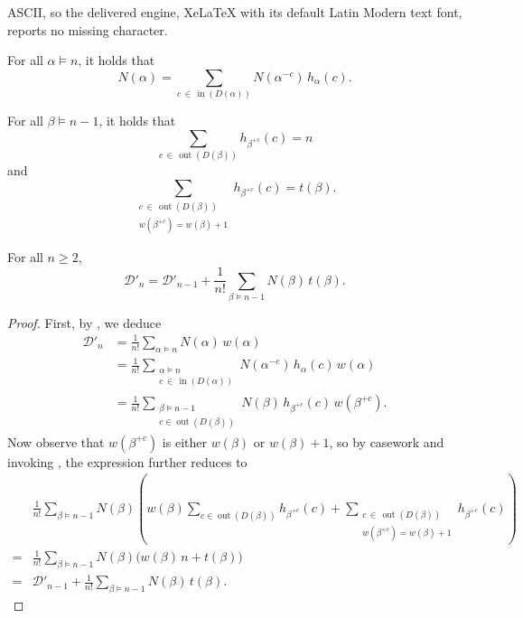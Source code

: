 \documentclass[10pt,a4paper]{amsart}
\DeclareMathOperator{\inn}{in}
\DeclareMathOperator{\out}{out}
\begin{document}
ASCII, so the delivered engine, XeLaTeX with its default Latin Modern text font, reports no missing character.
\begin{lemma}\label{lem:corner}
For all $\alpha\models n$, it holds that
\[N(\alpha) = \sum_{c\,\in\,\inn(D(\alpha))} N(\alpha^{-c})\,h_\alpha(c).\]
\end{lemma}

\begin{lemma}\label{lem:hooksum}
For all $\beta\models n-1$, it holds that
\[\sum_{c\,\in\,\out(D(\beta))} h_{\beta^{+c}}(c) = n\]
and
\[\sum_{\substack{c\,\in\,\out(D(\beta)) \\ w(\beta^{+c})=w(\beta)+1}} h_{\beta^{+c}}(c) = t(\beta).\]
\end{lemma}

\begin{theorem}\label{thm:increment}
For all $n\ge2$,
\[\mathcal{D}'_n = \mathcal{D}'_{n-1} + \frac{1}{n!}\sum_{\beta\models n-1} N(\beta)\,t(\beta).\]
\end{theorem}

\begin{proof}
First, by , we deduce
\begin{align*}
\mathcal{D}'_n
  &= \frac{1}{n!}\sum_{\alpha\models n}N(\alpha)\,w(\alpha) \\
  &= \frac{1}{n!}\sum_{\substack{\alpha\models n \\ c\,\in\,\inn(D(\alpha))}} N(\alpha^{-c})\,h_\alpha(c)\,w(\alpha) \\
  &= \frac{1}{n!}\sum_{\substack{\beta\models n-1 \\ c\in \out(D(\beta))}} N(\beta)\,h_{\beta^{+c}}(c)\,w(\beta^{+c}).
\end{align*}
Now observe that $w(\beta^{+c})$ is either $w(\beta)$ or $w(\beta)+1$, so by casework and invoking , the expression further reduces to
\begin{align*}
&\frac{1}{n!}\sum_{\beta\models n-1}N(\beta)\left(w(\beta)\sum_{c\in \out(D(\beta))}h_{\beta^{+c}}(c) + \sum_{\substack{c\,\in\,\out(D(\beta)) \\ w(\beta^{+c})=w(\beta)+1}} h_{\beta^{+c}}(c)\right) \\
= &\frac{1}{n!}\sum_{\beta\models n-1}N(\beta)\bigl(w(\beta)\, n+t(\beta)\bigr) \\
= &\mathcal{D}'_{n-1} + \frac{1}{n!}\sum_{\beta\models n-1}N(\beta)\,t(\beta).
\end{align*}
\end{proof}
\end{document}
